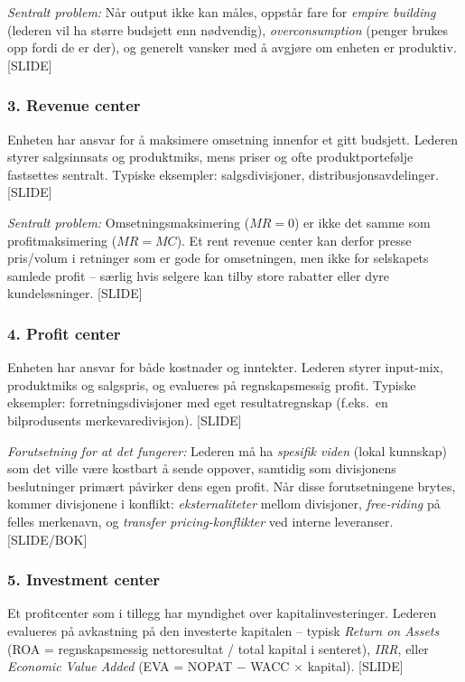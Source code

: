 \emph{Sentralt problem:} Når output ikke kan måles, oppstår fare for \emph{empire building} (lederen vil ha større budsjett enn nødvendig), \emph{overconsumption} (penger brukes opp fordi de er der), og generelt vansker med å avgjøre om enheten er produktiv. [SLIDE]

\subsubsection*{3. Revenue center}
Enheten har ansvar for å maksimere omsetning innenfor et gitt budsjett. Lederen styrer salgsinnsats og produktmiks, mens priser og ofte produktportefølje fastsettes sentralt. Typiske eksempler: salgsdivisjoner, distribusjonsavdelinger. [SLIDE]

\emph{Sentralt problem:} Omsetningsmaksimering ($MR = 0$) er ikke det samme som profitmaksimering ($MR = MC$). Et rent revenue center kan derfor presse pris/volum i retninger som er gode for omsetningen, men ikke for selskapets samlede profit -- særlig hvis selgere kan tilby store rabatter eller dyre kundeløsninger. [SLIDE]

\subsubsection*{4. Profit center}
Enheten har ansvar for både kostnader og inntekter. Lederen styrer input-mix, produktmiks og salgspris, og evalueres på regnskapsmessig profit. Typiske eksempler: forretningsdivisjoner med eget resultatregnskap (f.eks.\ en bilprodusents merkevaredivisjon). [SLIDE]

\emph{Forutsetning for at det fungerer:} Lederen må ha \emph{spesifik viden} (lokal kunnskap) som det ville være kostbart å sende oppover, samtidig som divisjonens beslutninger primært påvirker dens egen profit. Når disse forutsetningene brytes, kommer divisjonene i konflikt: \emph{eksternaliteter} mellom divisjoner, \emph{free-riding} på felles merkenavn, og \emph{transfer pricing-konflikter} ved interne leveranser. [SLIDE/BOK]

\subsubsection*{5. Investment center}
Et profitcenter som i tillegg har myndighet over kapitalinvesteringer. Lederen evalueres på avkastning på den investerte kapitalen -- typisk \emph{Return on Assets} (ROA = regnskapsmessig nettoresultat / total kapital i senteret), \emph{IRR}, eller \emph{Economic Value Added} (EVA = NOPAT $-$ WACC $\times$ kapital). [SLIDE]

